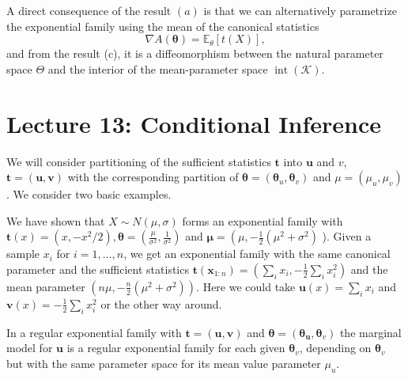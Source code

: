 \begin{remark}
    A direct consequence of the result $(a)$ is that we can alternatively parametrize the exponential family using the mean of the canonical statistics
    \[
    \nabla A(\boldsymbol\theta)=\mathbb{E}_\theta[t(X)],
    \]
    and from the result (c), it is a diffeomorphism between the natural parameter space $\Theta$ and the interior of the mean-parameter space $\operatorname{int}(\mathcal{K})$.
\end{remark}

\section{Lecture 13: Conditional Inference}

We will consider partitioning of the sufficient statistics $\mathbf{t}$ into $\boldsymbol{u}$ and $v$, $\mathbf{t}=(\boldsymbol{u}, \boldsymbol{v})$ with the corresponding partition of $\boldsymbol{\theta}=\left(\boldsymbol{\theta}_u, \boldsymbol{\theta}_v\right)$ and $\mu=\left(\mu_u, \mu_v\right)$. We consider two basic examples.
\begin{eg}
    We have shown that $X \sim N(\mu, \sigma)$ forms an exponential family with $\mathbf{t}(x)=\left(x,-x^2 / 2\right), \boldsymbol{\theta}=\left(\frac{\mu}{\sigma^2}, \frac{1}{\sigma^2}\right)$ and $\boldsymbol{\mu}=\left(\mu,-\frac{1}{2}\left(\mu^2+\right.\right. \left.\sigma^2\right)$ ). Given a sample $x_i$ for $i=1, \ldots, n$, we get an exponential family with the same canonical parameter and the sufficient statistics $\mathbf{t}\left(\mathbf{x}_{1: n}\right)= \left(\sum_i x_i,-\frac{1}{2} \sum_i x_i^2\right)$ and the mean parameter $\left(n \mu,-\frac{n}{2}\left(\mu^2+\sigma^2\right)\right)$. Here we could take $\boldsymbol{u}(x)=\sum_i x_i$ and $\boldsymbol{v}(x)=-\frac{1}{2} \sum_i x_i^2$ or the other way around.
\end{eg}

\begin{prop} 
In a regular exponential family with $\mathbf{t}=(\boldsymbol{u}, \boldsymbol{v})$ and $\boldsymbol{\theta}=\left(\boldsymbol{\theta}_{\boldsymbol{u}}, \boldsymbol{\theta}_v\right)$ the marginal model for $\boldsymbol{u}$ is a regular exponential family for each given $\boldsymbol{\theta}_v$, depending on $\boldsymbol{\theta}_v$ but with the same parameter space for its mean value parameter $\mu_u$.
\end{prop}

